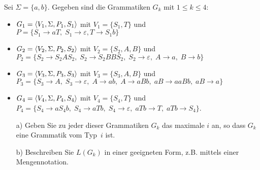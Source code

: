 
\begin{exercise}
Sei $\Sigma=\{a,b\}$. Gegeben sind die Grammatiken $G_k$ mit $1\le k\le 4$:
\begin{itemize}
\item $G_1=\langle{V_1,\Sigma,P_1,S_1}\rangle$ mit
      $V_1=\{S_{1},T\}$ und \\
      $P=\{S_{1}\rightarrow aT,\;S_{1}\rightarrow \varepsilon, T\rightarrow S_{1}b\}$
\item $G_2=\langle{V_2,\Sigma,P_2,S_2}\rangle$ mit
      $V_2=\{S_{2},A,B\}$ und \\
      $P_2=\{S_{2}\rightarrow S_{2}AS_{2},\;S_{2}\rightarrow S_{2}BBS_{2},\;S_{2}\rightarrow
      \varepsilon,\;A\rightarrow a,\;B\rightarrow
      b\}$
\item $G_3=\langle{V_3,\Sigma,P_3,S_3}\rangle$ mit
      $V_3=\{S_{3},A,B\}$ und \\
      $P_3=\{S_{3}\rightarrow A,\;S_{3}\rightarrow \varepsilon,\;A\rightarrow
      ab,\;A\rightarrow aBb,\;aB\rightarrow
      aaBb,\; aB\rightarrow a\}$
\item $G_4=\langle{V_4,\Sigma,P_4,S_4}\rangle$ mit
      $V_4=\{S_{4},T\}$ und \\
      $P_4=\{S_{4}\rightarrow aS_{4}b,\;S_{4}\rightarrow aTb,\;S_{4}\rightarrow \varepsilon,\;aTb\rightarrow
      T,\;aTb\rightarrow S_{4}\}$.
\end{itemize}
\begin{enumerate}
\item[a)] Geben Sie zu jeder dieser Grammatiken $G_k$ das maximale $i$ an, so dass $G_k$ eine Grammatik vom Typ~$i$ ist.
\item[b)] Beschreiben Sie $L(G_k)$ in einer geeigneten Form, z.B. mittels einer Mengennotation.
\end{enumerate}
\end{exercise}
